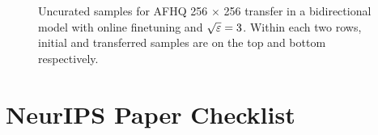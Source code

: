 \documentclass{article}
\begin{document}
\begin{figure}[htbp] 
    \centering 
    \hfill
    \hfill
    \caption{Uncurated samples for AFHQ 256 $\times$ 256 transfer in a bidirectional model with online finetuning and $\sqrt{\varepsilon}=3$. Within each two rows, initial and transferred samples are on the top and bottom respectively.} 
    \label{fig:afhq256_bidirectional_online_ema} 
\end{figure}



\FloatBarrier
\newpage
\section*{NeurIPS Paper Checklist}
\end{document}
